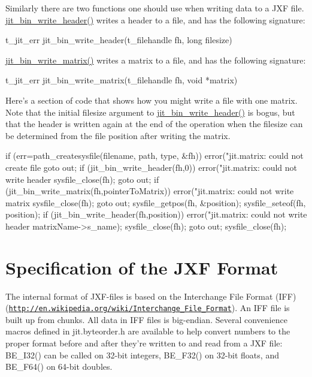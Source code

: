 Similarly there are two functions one should use when writing data to a JXF file. \hyperlink{group__binmod_ga01de67893378a46116aef0fbb36b5b33}{jit\_\-bin\_\-write\_\-header()} writes a header to a file, and has the following signature:


\begin{DoxyCode}
t_jit_err jit_bin_write_header(t_filehandle fh, long filesize)
\end{DoxyCode}


\hyperlink{group__binmod_ga8102ed7929a540a5584505049870887a}{jit\_\-bin\_\-write\_\-matrix()} writes a matrix to a file, and has the following signature:


\begin{DoxyCode}
t_jit_err jit_bin_write_matrix(t_filehandle fh, void *matrix)
\end{DoxyCode}


Here’s a section of code that shows how you might write a file with one matrix. Note that the initial filesize argument to \hyperlink{group__binmod_ga01de67893378a46116aef0fbb36b5b33}{jit\_\-bin\_\-write\_\-header()} is bogus, but that the header is written again at the end of the operation when the filesize can be determined from the file position after writing the matrix.


\begin{DoxyCode}
if (err=path_createsysfile(filename, path, type, &fh)) {
   error("jit.matrix: could not create file %
   goto out;
}
if (jit_bin_write_header(fh,0)) {
   error("jit.matrix: could not write header %
   sysfile_close(fh);
   goto out;
}
if (jit_bin_write_matrix(fh,pointerToMatrix)) {
   error("jit.matrix: could not write matrix %
   sysfile_close(fh);
   goto out;
}
sysfile_getpos(fh, &position);
sysfile_seteof(fh, position);
if (jit_bin_write_header(fh,position)) {
   error("jit.matrix: could not write header %
matrixName->s_name);
   sysfile_close(fh);
   goto out;
}
sysfile_close(fh);
\end{DoxyCode}
\hypertarget{chapter_jit_jxf_chapter_jit_jxf_spec}{}\section{Specification of the JXF Format}\label{chapter_jit_jxf_chapter_jit_jxf_spec}
The internal format of JXF-\/files is based on the Interchange File Format (IFF) (\href{http://en.wikipedia.org/wiki/Interchange_File_Format}{\tt http://en.wikipedia.org/wiki/Interchange\_\-File\_\-Format}). An IFF file is built up from chunks. All data in IFF files is big-\/endian. Several convenience macros defined in jit.byteorder.h are available to help convert numbers to the proper format before and after they're written to and read from a JXF file: BE\_\-I32() can be called on 32-\/bit integers, BE\_\-F32() on 32-\/bit floats, and BE\_\-F64() on 64-\/bit doubles.

